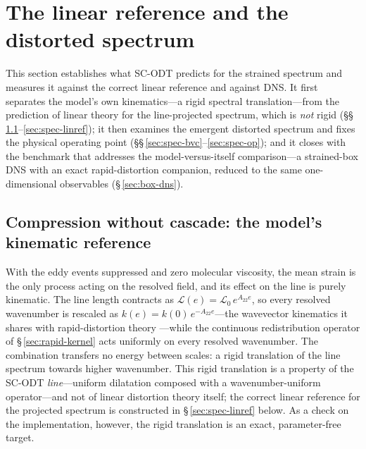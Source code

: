 \documentclass[lineno]{JFM-FLM_Au}
\begin{document}
\section{The linear reference and the distorted spectrum}\label{sec:val-spectrum}

This section establishes what SC-ODT predicts for the strained spectrum
and measures it against the correct linear reference and against DNS.
It first separates the model's own kinematics---a rigid spectral
translation---from the prediction of linear theory for the
line-projected spectrum, which is \emph{not} rigid
(\S\S\,\ref{sec:spec-rdt}--\ref{sec:spec-linref}); it then examines the
emergent distorted spectrum and fixes the physical operating point
(\S\S\,\ref{sec:spec-bvc}--\ref{sec:spec-op}); and it closes with the benchmark that addresses the model-versus-itself comparison---a
strained-box DNS with an exact rapid-distortion companion, reduced to
the same one-dimensional observables (\S\,\ref{sec:box-dns}).

\subsection{Compression without cascade: the model's kinematic
reference}\label{sec:spec-rdt}

With the eddy events suppressed and zero molecular viscosity, the mean strain
is the only process acting on the resolved field, and its effect on the line
is purely kinematic. The line length contracts as
$\mathcal{L}(e)=\mathcal{L}_0\,e^{A_{22}e}$, so every resolved wavenumber is
rescaled as $k(e)=k(0)\,e^{-A_{22}e}$---the wavevector kinematics it shares
with rapid-distortion theory \citep{BatchelorProudman1954,HuntCarruthers1990}%
---while the continuous redistribution operator of
\S\,\ref{sec:rapid-kernel} acts uniformly on every resolved wavenumber. The
combination transfers no energy between scales: a rigid translation of the
line spectrum towards higher wavenumber. This rigid translation is a property of the SC-ODT \emph{line}---uniform
dilatation composed with a wavenumber-uniform operator---and not of linear
distortion theory itself; the correct linear reference for the projected
spectrum is constructed in \S\,\ref{sec:spec-linref} below. As a check on the
implementation, however, the rigid translation is an exact, parameter-free
target.
\end{document}
